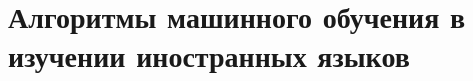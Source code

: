 \section{Алгоритмы машинного обучения в изучении иностранных языков}
\label{sec:section-1}





% 
% 
% 
% 
% 